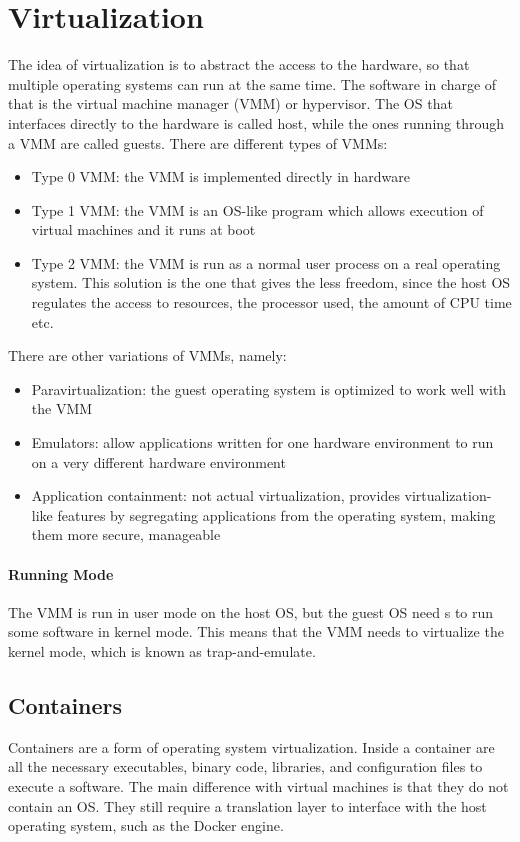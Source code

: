 \chapter{Virtualization}
The idea of virtualization is to abstract the access to the hardware, so that multiple operating systems can run at the same time. The software in charge of that is the virtual machine manager (VMM) or hypervisor. The OS that interfaces directly to the hardware is called host, while the ones running through a VMM are called guests. There are different types of VMMs:
\begin{itemize}
    \item Type 0 VMM: the VMM is implemented directly in hardware
    \item Type 1 VMM: the VMM is an OS-like program which allows execution of virtual machines and it runs at boot
    \item Type 2 VMM: the VMM is run as a normal user process on a real operating system. This solution is the one that gives the less freedom, since the host OS regulates the access to resources, the processor used, the amount of CPU time etc.
\end{itemize}

There are other variations of VMMs, namely:
\begin{itemize}
    \item Paravirtualization: the guest operating system is optimized to work well with the VMM
    \item Emulators: allow applications written for one hardware
    environment to run on a very different hardware environment
    \item Application containment: not actual virtualization, provides virtualization-like features by segregating applications from the operating system, making them more secure,
    manageable
\end{itemize}

\subsubsection{Running Mode}
The VMM is run in user mode on the host OS, but the guest OS need s to run some software in kernel mode. This means that the VMM needs to virtualize the kernel mode, which is known as trap-and-emulate.

\section{Containers}
Containers are a form of operating system virtualization. Inside a container are all the necessary executables, binary code, libraries, and configuration files to execute a software. The main difference with virtual machines is that they do not contain an OS. They still require a translation layer to interface with the host operating system, such as the Docker engine.

